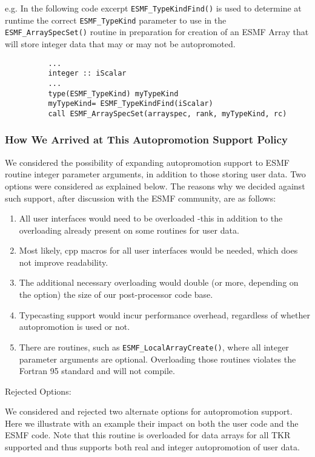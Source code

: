 \begin{enumerate}
      e.g. In the following code excerpt {\tt ESMF\_TypeKindFind()} is used to determine at runtime the correct {\tt ESMF\_TypeKind} parameter to use in the {\tt ESMF\_ArraySpecSet()} routine in preparation for creation of an ESMF Array that will store integer data that may or may not be autopromoted.
\begin{verbatim}
          ...
          integer :: iScalar
          ...
          type(ESMF_TypeKind) myTypeKind
          myTypeKind= ESMF_TypeKindFind(iScalar)
          call ESMF_ArraySpecSet(arrayspec, rank, myTypeKind, rc)
\end{verbatim}
\end{enumerate}

\subsubsection{How We Arrived at This Autopromotion Support Policy}

We considered the possibility of expanding autopromotion support to ESMF routine integer parameter arguments, in addition to those storing user data. Two options were considered as explained below. The reasons why we decided against such support, after discussion with the ESMF community, are as follows:
\begin{enumerate}
\item All user interfaces would need to be overloaded -this in addition to the overloading already present on some routines for user data.
\item Most likely, cpp macros for all user interfaces would be needed, which does not improve readability.
\item The additional necessary overloading would double (or more, depending on the option) the size of our post-processor code base.
\item Typecasting support would incur performance overhead, regardless of whether autopromotion is used or not.
\item There are routines, such as {\tt ESMF\_LocalArrayCreate()}, where all integer parameter arguments are optional. Overloading those routines violates the Fortran 95 standard and will not compile.
\end{enumerate}

Rejected Options:

We considered and rejected two alternate options for autopromotion support. Here we illustrate with an example their impact on both the user code and the ESMF code. Note that this routine is overloaded for data arrays for all TKR supported and thus supports both real and integer autopromotion of user data.

